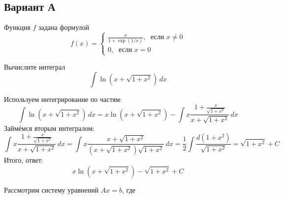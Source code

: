 \documentclass[addpoints, answers]{exam} %
\begin{document}
\subsection{Вариант А}
\begin{questions}

\question Функция $f$ задана формулой 
\[
f(x)=\begin{cases}
\frac{x}{1+\exp(1/x)}, \; \text{ если } x\neq 0 \\
0, \; \text{ если } x = 0
\end{cases}
\]

\question[10] Вычислите интеграл
\[
\int  \ln (x + \sqrt{1+x^2}) \, dx
\]

\begin{solution}
Используем интегрирование по частям:
\[
\int \ln (x + \sqrt{1+x^2}) \, dx = x \ln (x + \sqrt{1+x^2}) - \int x \frac{1+\frac{x}{\sqrt{1+x^2}}}{x + \sqrt{1+x^2}} \, dx 
\]
Займёмся вторым интегралом:
\[
\int x \frac{1+\frac{x}{\sqrt{1+x^2}}}{x + \sqrt{1+x^2}} \, dx =\int x \frac{x+\sqrt{1+x^2}}{(x + \sqrt{1+x^2})\sqrt{1+x^2}} \, dx =
\frac{1}{2}\int  \frac{d(1+x^2)}{\sqrt{1+x^2}} = \sqrt{1+x^2} + C
\]
Итого, ответ:
\[
x \ln (x + \sqrt{1+x^2}) - \sqrt{1+x^2} + C
\]

\end{solution}

\question Рассмотрим систему уравнений $Ax=b$, где 


\end{questions}
\end{document}

